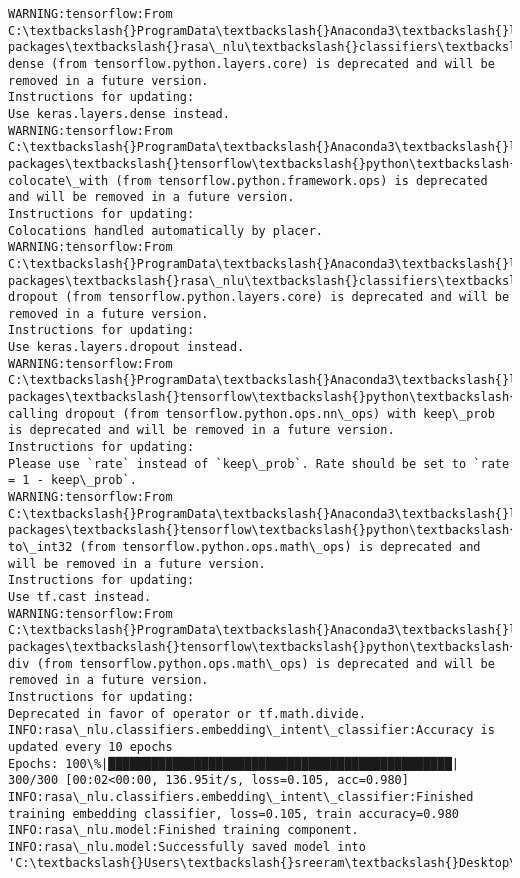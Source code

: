 \documentclass[11pt]{article}
\begin{document}
    \begin{Verbatim}[commandchars=\\\{\}]
WARNING:tensorflow:From C:\textbackslash{}ProgramData\textbackslash{}Anaconda3\textbackslash{}lib\textbackslash{}site-packages\textbackslash{}rasa\_nlu\textbackslash{}classifiers\textbackslash{}embedding\_intent\_classifier.py:285: dense (from tensorflow.python.layers.core) is deprecated and will be removed in a future version.
Instructions for updating:
Use keras.layers.dense instead.
WARNING:tensorflow:From C:\textbackslash{}ProgramData\textbackslash{}Anaconda3\textbackslash{}lib\textbackslash{}site-packages\textbackslash{}tensorflow\textbackslash{}python\textbackslash{}framework\textbackslash{}op\_def\_library.py:263: colocate\_with (from tensorflow.python.framework.ops) is deprecated and will be removed in a future version.
Instructions for updating:
Colocations handled automatically by placer.
WARNING:tensorflow:From C:\textbackslash{}ProgramData\textbackslash{}Anaconda3\textbackslash{}lib\textbackslash{}site-packages\textbackslash{}rasa\_nlu\textbackslash{}classifiers\textbackslash{}embedding\_intent\_classifier.py:286: dropout (from tensorflow.python.layers.core) is deprecated and will be removed in a future version.
Instructions for updating:
Use keras.layers.dropout instead.
WARNING:tensorflow:From C:\textbackslash{}ProgramData\textbackslash{}Anaconda3\textbackslash{}lib\textbackslash{}site-packages\textbackslash{}tensorflow\textbackslash{}python\textbackslash{}keras\textbackslash{}layers\textbackslash{}core.py:143: calling dropout (from tensorflow.python.ops.nn\_ops) with keep\_prob is deprecated and will be removed in a future version.
Instructions for updating:
Please use `rate` instead of `keep\_prob`. Rate should be set to `rate = 1 - keep\_prob`.
WARNING:tensorflow:From C:\textbackslash{}ProgramData\textbackslash{}Anaconda3\textbackslash{}lib\textbackslash{}site-packages\textbackslash{}tensorflow\textbackslash{}python\textbackslash{}ops\textbackslash{}math\_ops.py:3066: to\_int32 (from tensorflow.python.ops.math\_ops) is deprecated and will be removed in a future version.
Instructions for updating:
Use tf.cast instead.
WARNING:tensorflow:From C:\textbackslash{}ProgramData\textbackslash{}Anaconda3\textbackslash{}lib\textbackslash{}site-packages\textbackslash{}tensorflow\textbackslash{}python\textbackslash{}ops\textbackslash{}math\_grad.py:102: div (from tensorflow.python.ops.math\_ops) is deprecated and will be removed in a future version.
Instructions for updating:
Deprecated in favor of operator or tf.math.divide.
INFO:rasa\_nlu.classifiers.embedding\_intent\_classifier:Accuracy is updated every 10 epochs
Epochs: 100\%|████████████████████████████████████████████████| 300/300 [00:02<00:00, 136.95it/s, loss=0.105, acc=0.980]
INFO:rasa\_nlu.classifiers.embedding\_intent\_classifier:Finished training embedding classifier, loss=0.105, train accuracy=0.980
INFO:rasa\_nlu.model:Finished training component.
INFO:rasa\_nlu.model:Successfully saved model into 'C:\textbackslash{}Users\textbackslash{}sreeram\textbackslash{}Desktop\textbackslash{}chatbot\textbackslash{}models\textbackslash{}nlu\textbackslash{}default\textbackslash{}current'

    \end{Verbatim}
\end{document}
